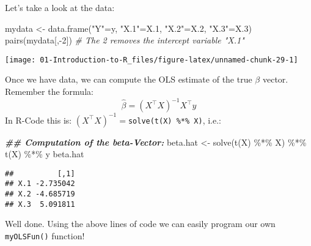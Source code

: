 \documentclass[
]{book}
\newenvironment{Shaded}{\begin{snugshade}}{\end{snugshade}}
\newcommand{\CommentTok}[1]{\textcolor[rgb]{0.56,0.35,0.01}{\textit{#1}}}
\newcommand{\DecValTok}[1]{\textcolor[rgb]{0.00,0.00,0.81}{#1}}
\newcommand{\DocumentationTok}[1]{\textcolor[rgb]{0.56,0.35,0.01}{\textbf{\textit{#1}}}}
\newcommand{\FloatTok}[1]{\textcolor[rgb]{0.00,0.00,0.81}{#1}}
\newcommand{\FunctionTok}[1]{\textcolor[rgb]{0.00,0.00,0.00}{#1}}
\newcommand{\NormalTok}[1]{#1}
\newcommand{\OtherTok}[1]{\textcolor[rgb]{0.56,0.35,0.01}{#1}}
\newcommand{\SpecialCharTok}[1]{\textcolor[rgb]{0.00,0.00,0.00}{#1}}
\newcommand{\StringTok}[1]{\textcolor[rgb]{0.31,0.60,0.02}{#1}}
\begin{document}
Let's take a look at the data:

\begin{Shaded}
\begin{Highlighting}[]
\NormalTok{mydata    }\OtherTok{\textless{}{-}} \FunctionTok{data.frame}\NormalTok{(}\StringTok{"Y"}\OtherTok{=}\NormalTok{y, }\StringTok{"X.1"}\OtherTok{=}\NormalTok{X}\FloatTok{.1}\NormalTok{, }\StringTok{"X.2"}\OtherTok{=}\NormalTok{X}\FloatTok{.2}\NormalTok{, }\StringTok{"X.3"}\OtherTok{=}\NormalTok{X}\FloatTok{.3}\NormalTok{)}
\FunctionTok{pairs}\NormalTok{(mydata[,}\SpecialCharTok{{-}}\DecValTok{2}\NormalTok{]) }\CommentTok{\# The \textquotesingle{}{-}2\textquotesingle{} removes the intercept variable "X.1"}
\end{Highlighting}
\end{Shaded}

\begin{center}\texttt{[image: 01-Introduction-to-R\_files/figure-latex/unnamed-chunk-29-1]} \end{center}

\hfill\break

Once we have data, we can compute the OLS estimate of the true \(\beta\) vector. Remember the formula:
\[\hat{\beta}=(X^\top X)^{-1}X^\top y\]
In R-Code this is: \((X^\top X)^{-1}=\)\texttt{solve(t(X)\ \%*\%\ X)}, i.e.:

\begin{Shaded}
\begin{Highlighting}[]
\DocumentationTok{\#\# Computation of the beta{-}Vector:}
\NormalTok{beta.hat }\OtherTok{\textless{}{-}} \FunctionTok{solve}\NormalTok{(}\FunctionTok{t}\NormalTok{(X) }\SpecialCharTok{\%*\%}\NormalTok{ X) }\SpecialCharTok{\%*\%} \FunctionTok{t}\NormalTok{(X) }\SpecialCharTok{\%*\%}\NormalTok{ y}
\NormalTok{beta.hat}
\end{Highlighting}
\end{Shaded}

\begin{verbatim}
##          [,1]
## X.1 -2.735042
## X.2 -4.685719
## X.3  5.091811
\end{verbatim}

\hfill\break

Well done. Using the above lines of code we can easily program our own \texttt{myOLSFun()} function!
\end{document}
